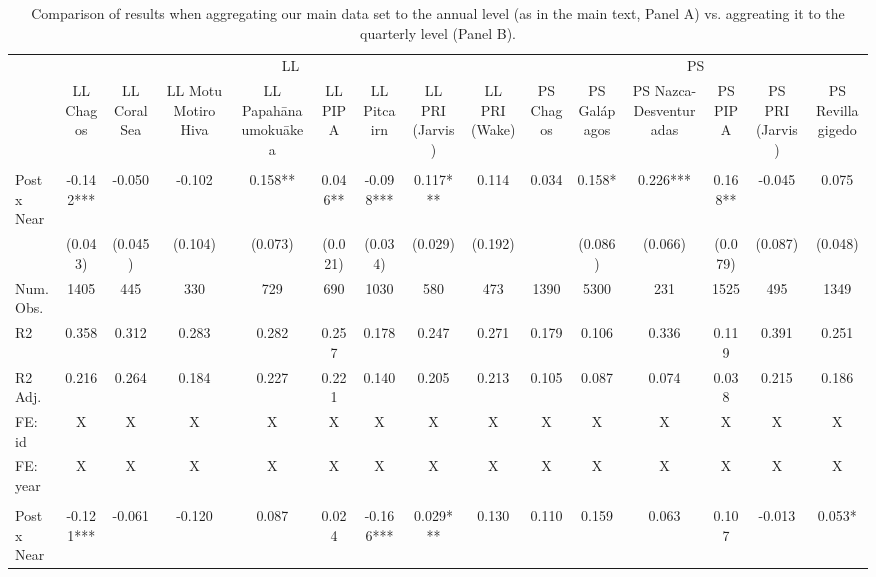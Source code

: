 \begin{table}

\caption{Comparison of results when aggregating our main data set to the annual level (as in the main text, Panel A) vs. aggreating it to the quarterly level (Panel B).}
\centering
\begin{tabular}[t]{lcccccccccccccc}
\toprule
\multicolumn{1}{c}{ } & \multicolumn{8}{c}{LL} & \multicolumn{6}{c}{PS} \\
\cmidrule(l{3pt}r{3pt}){2-9} \cmidrule(l{3pt}r{3pt}){10-15}
 & LL Chagos & LL Coral Sea & LL Motu Motiro Hiva & LL Papahānaumokuākea & LL PIPA & LL Pitcairn & LL PRI (Jarvis) & LL PRI (Wake) & PS Chagos & PS Galápagos & PS Nazca-Desventuradas & PS PIPA & PS PRI (Jarvis) & PS Revillagigedo\\
\midrule
\addlinespace[0.3em]
\multicolumn{15}{l}{Panel A: Aggregating data to the year-flag level (form main text)}\\
\hspace{1em}Post x Near & -0.142*** & -0.050 & -0.102 & 0.158** & 0.046** & -0.098*** & 0.117*** & 0.114 & 0.034 & 0.158* & 0.226*** & 0.168** & -0.045 & 0.075\\
\hspace{1em} & (0.043) & (0.045) & (0.104) & (0.073) & (0.021) & (0.034) & (0.029) & (0.192) &  & (0.086) & (0.066) & (0.079) & (0.087) & (0.048)\\
\hspace{1em}Num.Obs. & 1405 & 445 & 330 & 729 & 690 & 1030 & 580 & 473 & 1390 & 5300 & 231 & 1525 & 495 & 1349\\
\hspace{1em}R2 & 0.358 & 0.312 & 0.283 & 0.282 & 0.257 & 0.178 & 0.247 & 0.271 & 0.179 & 0.106 & 0.336 & 0.119 & 0.391 & 0.251\\
\hspace{1em}R2 Adj. & 0.216 & 0.264 & 0.184 & 0.227 & 0.221 & 0.140 & 0.205 & 0.213 & 0.105 & 0.087 & 0.074 & 0.038 & 0.215 & 0.186\\
\hspace{1em}FE: id & X & X & X & X & X & X & X & X & X & X & X & X & X & \vphantom{1} X\\
\hspace{1em}FE: year & X & X & X & X & X & X & X & X & X & X & X & X & X & \vphantom{1} X\\
\addlinespace[0.5cm]
\multicolumn{15}{l}{Panel B: Aggregatign data to tye year-quarter-flag level}\\
\hspace{1em}Post x Near & -0.121*** & -0.061 & -0.120 & 0.087 & 0.024 & -0.166*** & 0.029*** & 0.130 & 0.110 & 0.159 & 0.063 & 0.107 & -0.013 & 0.053*\\

\end{tabular}
\end{table}
